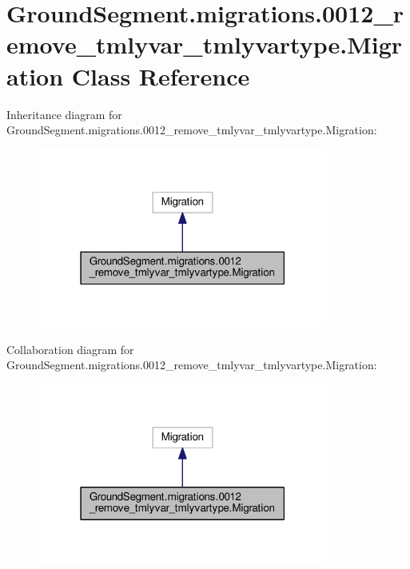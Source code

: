 \hypertarget{class_ground_segment_1_1migrations_1_10012__remove__tmlyvar__tmlyvartype_1_1_migration}{}\section{Ground\+Segment.\+migrations.0012\+\_\+remove\+\_\+tmlyvar\+\_\+tmlyvartype.Migration Class Reference}
\label{class_ground_segment_1_1migrations_1_10012__remove__tmlyvar__tmlyvartype_1_1_migration}


Inheritance diagram for Ground\+Segment.\+migrations.0012\+\_\+remove\+\_\+tmlyvar\+\_\+tmlyvartype.Migration\+:\nopagebreak
\begin{figure}[H]
\begin{center}
\leavevmode
\includegraphics[width=271pt]{class_ground_segment_1_1migrations_1_10012__remove__tmlyvar__tmlyvartype_1_1_migration__inherit__graph}
\end{center}
\end{figure}


Collaboration diagram for Ground\+Segment.\+migrations.0012\+\_\+remove\+\_\+tmlyvar\+\_\+tmlyvartype.Migration\+:\nopagebreak
\begin{figure}[H]
\begin{center}
\leavevmode
\includegraphics[width=271pt]{class_ground_segment_1_1migrations_1_10012__remove__tmlyvar__tmlyvartype_1_1_migration__coll__graph}
\end{center}
\end{figure}

